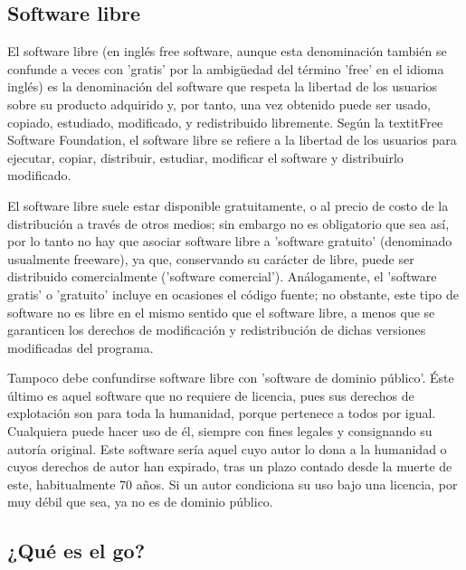 \documentclass[12pt,a4papert,woside,openright,titlepage,final]{book}
\begin{document}
\subsection{Software libre}

El software libre (en inglés free software, aunque esta denominación también se
confunde a veces con 'gratis' por la ambigüedad del término 'free' en el idioma
inglés) es la denominación del software que respeta la libertad de los usuarios
sobre su producto adquirido y, por tanto, una vez obtenido puede ser usado,
copiado, estudiado, modificado, y redistribuido libremente. Según la textit{Free
Software Foundation}, el software libre se refiere a la libertad de los usuarios
para ejecutar, copiar, distribuir, estudiar, modificar el software y
distribuirlo modificado.

El software libre suele estar disponible gratuitamente, o al precio de costo de
la distribución a través de otros medios; sin embargo no es obligatorio que sea
así, por lo tanto no hay que asociar software libre a 'software gratuito'
(denominado usualmente freeware), ya que, conservando su carácter de libre,
puede ser distribuido comercialmente ('software comercial'). Análogamente, el
'software gratis' o 'gratuito' incluye en ocasiones el código fuente; no
obstante, este tipo de software no es libre en el mismo sentido que el software
libre, a menos que se garanticen los derechos de modificación y redistribución
de dichas versiones modificadas del programa.

Tampoco debe confundirse software libre con 'software de dominio público'. Éste
último es aquel software que no requiere de licencia, pues sus derechos de
explotación son para toda la humanidad, porque pertenece a todos por igual.
Cualquiera puede hacer uso de él, siempre con fines legales y consignando su
autoría original. Este software sería aquel cuyo autor lo dona a la humanidad o
cuyos derechos de autor han expirado, tras un plazo contado desde la muerte de
este, habitualmente 70 años. Si un autor condiciona su uso bajo una licencia,
por muy débil que sea, ya no es de dominio público.


\subsection{¿Qué es el go?}
\end{document}

